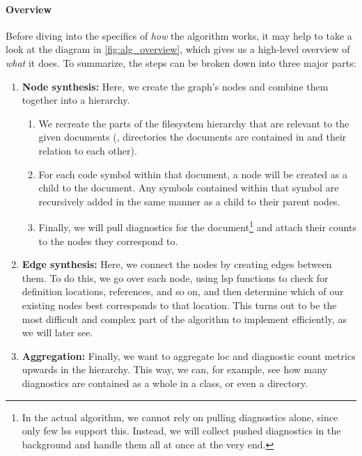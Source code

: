\documentclass[../thesis]{subfiles}
\begin{document}
\paragraph{Overview}
Before diving into the specifics of \emph{how} the algorithm works, it may help to take a look at the diagram in \cref{fig:alg_overview}, which gives us a high-level overview of \emph{what} it does.
To summarize, the steps can be broken down into three major parts:
\begin{enumerate}[label=\bfseries\Roman*]
	\item \textbf{Node synthesis:} Here, we create the graph's nodes and combine them together into a hierarchy.
	      \begin{enumerate}[label=\arabic*.]
		      \item We recreate the parts of the filesystem hierarchy that are relevant to the given documents (\ie, directories the documents are contained in and their relation to each other).
		      \item For each code symbol within that document, a node will be created as a child to the document.
		            Any symbols contained within that symbol are recursively added in the same manner as a child to their parent nodes.
		      \item Finally, we will pull diagnostics for the document\footnote{
			            In the actual algorithm, we cannot rely on pulling diagnostics alone, since only few \glspl{ls} support this.
			            Instead, we will collect pushed diagnostics in the background and handle them all at once at the very end.
		            } and attach their counts to the nodes they correspond to.
	      \end{enumerate}
	\item \textbf{Edge synthesis:} Here, we connect the nodes by creating edges between them.
	      To do this, we go over each node, using \gls{lsp} functions to check for definition locations, references, and so on, and then determine which of our existing nodes best corresponds to that location.
	      This turns out to be the most difficult and complex part of the algorithm to implement efficiently, as we will later see.
	\item \textbf{Aggregation:} Finally, we want to aggregate \gls{loc} and diagnostic count metrics upwards in the hierarchy.
	      This way, we can, for example, see how many diagnostics are contained as a whole in a class, or even a directory.
\end{enumerate}
\end{document}
